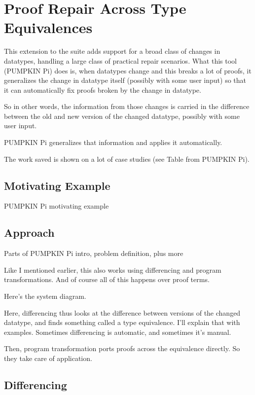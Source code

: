 \chapter{Proof Repair Across Type Equivalences}
\label{chapt:pi}

This extension to the suite adds support for a broad class of changes in datatypes, handling a large class of practical repair scenarios.
What this tool (PUMPKIN Pi) does is, when datatypes change and this breaks a lot of proofs, it generalizes the change in datatype itself (possibly with some user input) so that it can automatically fix proofs broken by the change in datatype. 

So in other words, the information from those changes is carried in the difference between the old and new version of the changed datatype, possibly with some user input.

PUMPKIN Pi generalizes that information and applies it automatically.

The work saved is shown on a lot of case studies (see Table from PUMPKIN Pi).

\section{Motivating Example}

PUMPKIN Pi motivating example

\section{Approach}

Parts of PUMPKIN Pi intro, problem definition, plus more

Like I mentioned earlier, this also works using differencing and program transformations. And of course all of this happens over proof terms.

Here's the system diagram.

Here, differencing thus looks at the difference between versions of the changed datatype, and finds something called a type equivalence. I'll explain that with examples. Sometimes differencing is automatic, and sometimes it's manual.

Then, program transformation ports proofs across the equivalence directly. So they take care of application.

\section{Differencing}

